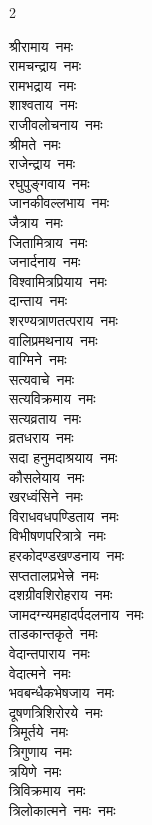 \begin{multicols}{2}
\begin{flushleft}
श्रीरामाय~नमः\\
रामचन्द्राय~नमः\\
रामभद्राय~नमः\\
शाश्वताय~नमः\\
राजीवलोचनाय~नमः\\
श्रीमते~नमः\\
राजेन्द्राय~नमः\\
रघुपुङ्गवाय~नमः\\
जानकीवल्लभाय~नमः\\
जैत्राय~नमः\hfill{}\\
जितामित्राय~नमः\\
जनार्दनाय~नमः\\
विश्वामित्रप्रियाय~नमः\\
दान्ताय~नमः\\
शरण्यत्राणतत्पराय~नमः\\
वालिप्रमथनाय~नमः\\
वाग्मिने~नमः\\
सत्यवाचे~नमः\\
सत्यविक्रमाय~नमः\\
सत्यव्रताय~नमः\hfill{}\\
व्रतधराय~नमः\\
सदा हनुमदाश्रयाय~नमः\\
कौसलेयाय~नमः\\
खरध्वंसिने~नमः\\
विराधवधपण्डिताय~नमः\\
विभीषणपरित्रात्रे~नमः\\
हरकोदण्डखण्डनाय~नमः\\
सप्ततालप्रभेत्त्रे~नमः\\
दशग्रीवशिरोहराय~नमः\\
जामदग्न्यमहादर्पदलनाय~नमः\hfill{}\\
ताडकान्तकृते~नमः\\
वेदान्तपाराय~नमः\\
वेदात्मने~नमः\\
भवबन्धैकभेषजाय~नमः\\
दूषणत्रिशिरोरये~नमः\\
त्रिमूर्तये~नमः\\
त्रिगुणाय~नमः\\
त्रयिणे~नमः\\
त्रिविक्रमाय~नमः\\
त्रिलोकात्मने~नमः~नमः\hfill{}\\

\end{flushleft}
\end{multicols}
